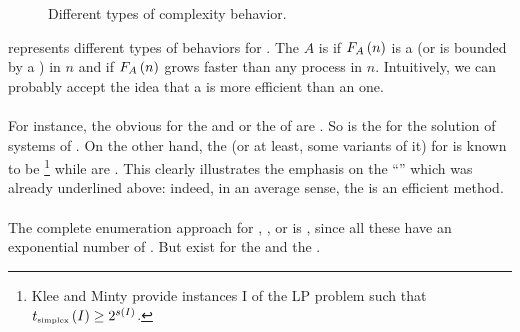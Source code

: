 \begin{figure}[hbt]
\centering
{}
\caption{Different types of complexity behavior.}
\end{figure}

 represents different types of  behaviors for . The  $A$ is  if $F_A\left( n \right)$ is a  (or is bounded by a ) in $n$ and  if $F_A\left( n \right)$ grows faster than any  process in $n$. Intuitively, we can probably accept the idea that a   is more efficient than an  one.

\paragraph{}
For instance, the obvious  for the  and or the  of  are . So is the  for the solution of systems of . On the other hand, the  (or at least, some variants of it) for  is known to be \footnote{Klee and Minty provide instances I of the LP problem such that $t_{\mbox{\tiny simplex}}\left( I \right)\geq 2^{s\left( I \right)}$.} while  are . This clearly illustrates the emphasis on the ``'' which was already underlined above: indeed, in an average sense, the  is an efficient method.

\paragraph{}
The complete enumeration approach for , ,  or  is , since all these  have an exponential number of . But  exist for the  and the .

